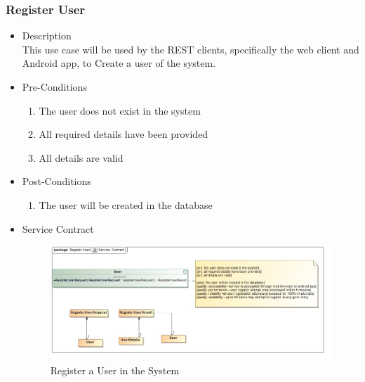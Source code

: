 \documentclass[a4paper,10pt]{article}
\begin{document}
\subsubsection{Register User}
	\begin{itemize}
		\item Description\\
			This use case will be used by the REST clients, specifically the web client and Android app, to Create a user of the system.
		\item Pre-Conditions
			\begin{enumerate}
				\item The user does not exist in the system
				\item All required details have been provided
				\item All details are valid
			\end{enumerate}
		\item Post-Conditions
			\begin{enumerate}
				\item The user will be created in the database
						
			\end{enumerate}
		\item Service Contract
			\begin{figure}[H]
				\includegraphics[scale=0.5]{Register_User}
				\caption{Register a User in the System}
			\end{figure}
	\end{itemize}
\end{document}
